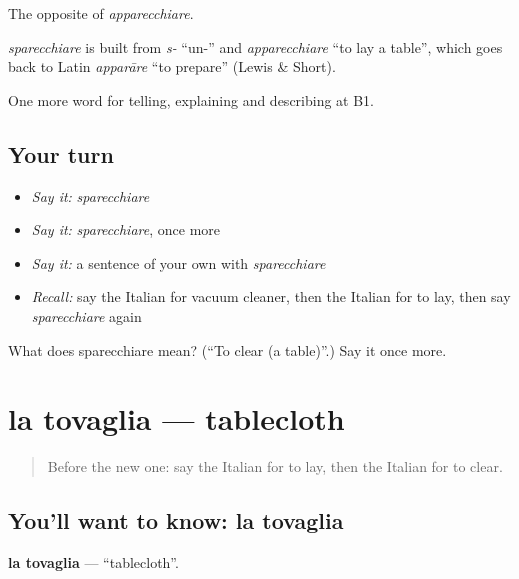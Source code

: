 The opposite of \emph{apparecchiare}.

\begin{cousinweb}
\emph{sparecchiare} is built from \emph{s-} \textquotedblleft{}un-\textquotedblright{} and \emph{apparecchiare} \textquotedblleft{}to lay a table\textquotedblright{}, which goes back to Latin \emph{apparāre} \textquotedblleft{}to prepare\textquotedblright{} (Lewis \& Short).
\end{cousinweb}

\begin{grammarlens}[title={What you've built}]
One more word for telling, explaining and describing at B1.
\end{grammarlens}

\subsection*{Your turn}
\begin{itemize}
\raggedright
  \item \emph{Say it:} \emph{sparecchiare}
  \item \emph{Say it:} \emph{sparecchiare}, once more
  \item \emph{Say it:} a sentence of your own with \emph{sparecchiare}
  \item \emph{Recall:} say the Italian for vacuum cleaner, then the Italian for to lay, then say \emph{sparecchiare} again
\end{itemize}

\begin{tcolorbox}[breakable,colback=teal!4,colframe=teal!35!black,title={Before you move on}]
What does sparecchiare mean? (\textquotedblleft{}To clear (a table)\textquotedblright{}.) Say it once more.
\end{tcolorbox}
\section[la tovaglia]{la tovaglia — tablecloth}

\label{lesson:IT-C533-tovaglia}



\begin{quote}
Before the new one: say the Italian for to lay, then the Italian for to clear.
\end{quote}

\subsection*{You'll want to know: la tovaglia}
\textbf{la tovaglia} — \textquotedblleft{}tablecloth\textquotedblright{}.

